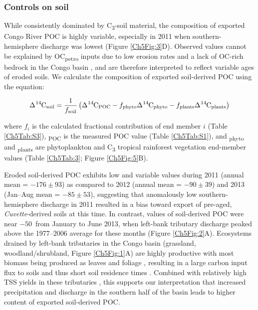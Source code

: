 \subsubsection{Controls on soil }

While consistently dominated by C\textsubscript{3}-soil material, the  composition of exported Congo River POC is highly variable, especially in 2011 when southern-hemisphere discharge was lowest (Figure \ref{Ch5Fig:3}D). Observed  values cannot be explained by OC\textsubscript{petro} inputs due to low erosion rates and a lack of OC-rich bedrock in the Congo basin \citep{Copard:2007bf}, and are therefore interpreted to reflect variable ages of eroded soils. We calculate the  composition of exported soil-derived POC using the equation:

\begin{equation}\label{Ch5Eq:4}
	\ce{\Delta^{14}C}_{\text{soil}} = \frac{1}{f_{\text{soil}}} \left(\ce{\Delta^{14}C}_{\text{POC}} - f_{\text{phyto}}\ce{\Delta^{14}C}_{\text{phyto}} - f_{\text{plants}}\ce{\Delta^{14}C}_{\text{plants}} \right)
\end{equation}

where $f_i$ is the calculated fractional contribution of end member $i$ (Table \ref{Ch5Tab:S3}), \textsubscript{POC} is the measured POC  value (Table \ref{Ch5Tab:S1}), and \textsubscript{phyto} and \textsubscript{plants} are phytoplankton and C\textsubscript{3} tropical rainforest vegetation end-member values (Table \ref{Ch5Tab:3}; Figure \ref{Ch5Fig:5}B). 

Eroded soil-derived POC exhibits low and variable  values during 2011 (annual mean = $-176 \pm 93$\textperthousand) as compared to 2012 (annual mean = $-90 \pm 39$\textperthousand) and 2013 (Jan--Aug mean = $-85 \pm 53$\textperthousand), suggesting that anomalously low southern-hemisphere discharge in 2011 resulted in a bias toward export of pre-aged, \textit{Cuvette}-derived soils at this time. In contrast,  values of soil-derived POC were near $-50$\textperthousand\ from January to June 2013, when left-bank tributary discharge peaked above the 1977--2006 average for these months (Figure \ref{Ch5Fig:2}A). Ecosystems drained by left-bank tributaries in the Congo basin (grassland, woodland/shrubland, Figure \ref{Ch5Fig:1}A) are highly productive with most biomass being produced as leaves and foliage \citep{Bloom:2016gm}, resulting in a large carbon input flux to soils and thus short soil residence times \citep{Carvalhais:2014dc}. Combined with relatively high TSS yields in these tributaries \citep{Laraque:2009fz}, this supports our interpretation that increased precipitation and discharge in the southern half of the basin leads to higher  content of exported soil-derived POC.

